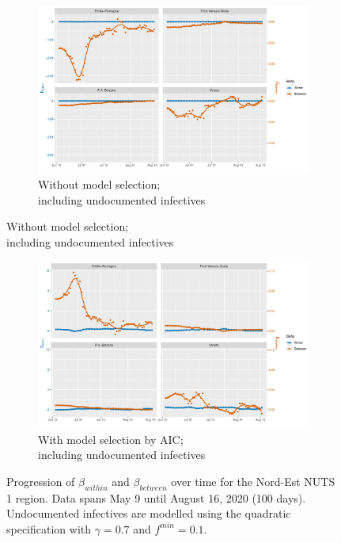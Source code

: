 \documentclass[12pt]{article}
\begin{document}
    \begin{figure}[H]\ContinuedFloat
	    \begin{subfigure}{\textwidth}
	      \centering
	      \includegraphics[width=\linewidth]{output/model_between_lag14_betas_Nord-Est_UndocQuadratic_rolling.pdf}
	      \caption{Without model selection; \\ including undocumented infectives}
	      \label{fig:beta_between_over_time_nordest_regular_undoc}
	    \end{subfigure}
    \end{figure}
    \begin{figure}[H]\ContinuedFloat
	    \begin{subfigure}{\textwidth}
	      \centering
	      \includegraphics[width=\linewidth]{output/model_between_lag14_betas_Nord-Est_aic_UndocQuadratic_rolling.pdf}
	      \caption{With model selection by AIC; \\ including undocumented infectives}
	      \label{fig:beta_between_over_time_nordest_aic_undoc}
	    \end{subfigure}
	    \caption{Progression of $\beta_{within}$ and $\beta_{between}$ over time for the Nord-Est NUTS 1 region. Data spans May 9 until August 16, 2020 (100 days). Undocumented infectives are modelled using the quadratic specification with $\gamma = 0.7$ and $f^{min}=0.1$.}
	    \label{fig:beta_between_over_time_nordest}
    \end{figure}
	
\end{document}
